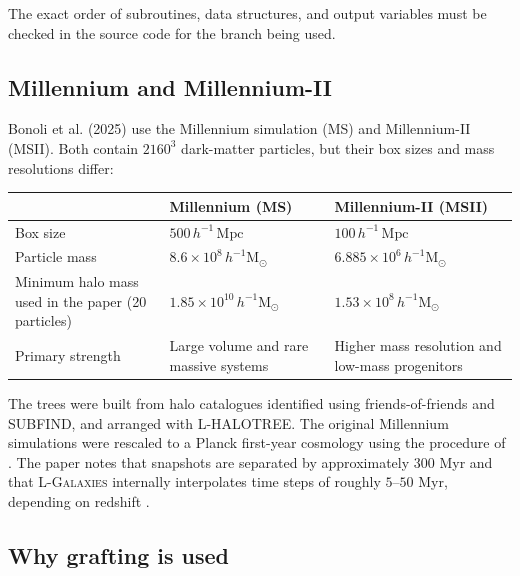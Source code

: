 \documentclass[11pt,a4paper]{article}
\newcommand{\Msun}{\mathrm{M}_{\odot}}
\newcommand{\Lgal}{\textsc{L-Galaxies}}
\begin{document}
The exact order of subroutines, data structures, and output variables must be checked in the source code for the branch being used.

\subsection{Millennium and Millennium-II}

Bonoli et al. (2025) use the Millennium simulation (MS) and Millennium-II (MSII). Both contain $2160^3$ dark-matter particles, but their box sizes and mass resolutions differ:

\begin{center}
\begin{tabularx}{0.95\linewidth}{lXX}
\toprule
 & Millennium (MS) & Millennium-II (MSII) \\
\midrule
Box size & $500\,h^{-1}\,\mathrm{Mpc}$ & $100\,h^{-1}\,\mathrm{Mpc}$ \\
Particle mass & $8.6\times10^8\,h^{-1}\Msun$ & $6.885\times10^6\,h^{-1}\Msun$ \\
Minimum halo mass used in the paper (20 particles) & $1.85\times10^{10}\,h^{-1}\Msun$ & $1.53\times10^8\,h^{-1}\Msun$ \\
Primary strength & Large volume and rare massive systems & Higher mass resolution and low-mass progenitors \\
\bottomrule
\end{tabularx}
\end{center}

The trees were built from halo catalogues identified using friends-of-friends and SUBFIND, and arranged with L-HALOTREE. The original Millennium simulations were rescaled to a Planck first-year cosmology using the procedure of \citet{AnguloWhite2010}. The paper notes that snapshots are separated by approximately $300$ Myr and that \Lgal{} internally interpolates time steps of roughly $5$--$50$ Myr, depending on redshift \citep{Bonoli2025}.

\subsection{Why grafting is used}
\end{document}
